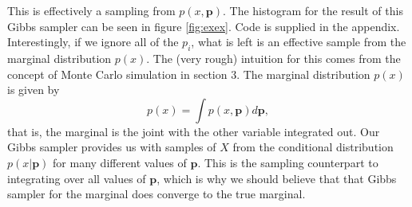 \documentclass[11pt]{amsart}
\theoremstyle{theorem} %
\theoremstyle{definition}                  %
\theoremstyle{example}                       %
\theoremstyle{remark}                       %
\numberwithin{equation}{section}
\begin{document}
This is effectively a sampling from $p(x,\mathbf{p})$. The histogram for the result of this Gibbs sampler can be seen in figure \ref{fig:exex}. Code is supplied in the appendix. Interestingly, if we ignore all of the $p_i$, what is left is an effective sample from the marginal distribution $p(x)$. The (very rough) intuition for this comes from the concept of Monte Carlo simulation in section 3. The marginal distribution $p(x)$ is given by
\[p(x) = \int p(x,\mathbf{p}) d\mathbf{p},\]
that is, the marginal is the joint with the other variable integrated out. Our Gibbs sampler provides us with samples of $X$ from the conditional distribution $p(x|\mathbf{p})$ for many different values of $\mathbf{p}$. This is the sampling counterpart to integrating over all values of $\mathbf{p}$, which is why we should believe that that Gibbs sampler for the marginal does converge to the true marginal.
\end{document}
